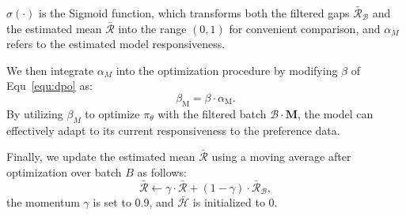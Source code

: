 $\sigma(\cdot)$ is the Sigmoid function, which transforms both the filtered gaps $\bar{\mathcal{R}}_{\mathcal{B}}$ and the estimated mean $\bar{\mathcal{R}}$ into the range $(0, 1)$ for convenient comparison, and $\alpha_{M}$ refers to the estimated model responsiveness.

We then integrate $\alpha_{M}$ into the optimization procedure by modifying $\beta$ of Equ~\eqref{equ:dpo} as:
\begin{equation}
\label{equ:update beta reward}
    \beta_{\text{M}} = \beta \cdot \alpha_{\text{M}}.
\end{equation}
By utilizing $\beta_{M}$ to optimize $\pi_{\theta}$ with the filtered batch $\mathcal{B} \cdot \mathbf{M}$, the model can effectively adapt to its current responsiveness to the preference data.

Finally, we update the estimated mean $\bar{\mathcal{R}}$ using a moving average after optimization over batch $B$ as follows:
\begin{equation}
\label{equ:update mean}
    \bar{\mathcal{R}} \bm{\leftarrow} \gamma \cdot  \bar{\mathcal{R}} + (1- \gamma) \cdot \bar{\mathcal{R}}_{\mathcal{B}},
\end{equation}
the momentum $\gamma$ is set to $0.9$, and $\bar{\mathcal{H}}$ is initialized to $0$. 


